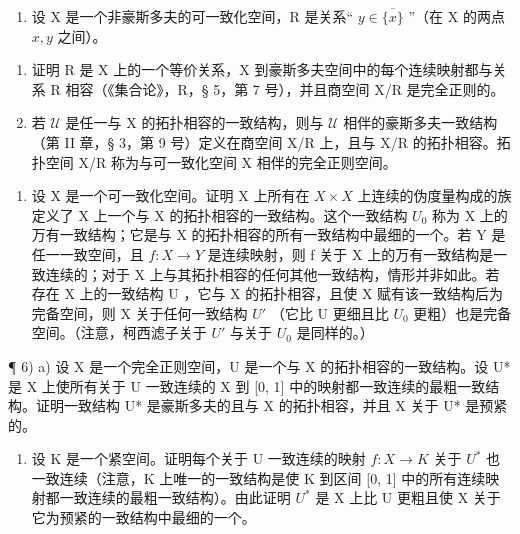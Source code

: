 \begin{enumerate}
\def\labelenumi{\arabic{enumi})}
\setcounter{enumi}{3}
\tightlist
\item
  设 X 是一个非豪斯多夫的可一致化空间，R 是关系`` \(y \in \overline{\{x\}}\) ''（在 X 的两点 \(x, y\) 之间）。
\end{enumerate}

\begin{enumerate}
\def\labelenumi{\alph{enumi})}
\item
  证明 R 是 X 上的一个等价关系，X 到豪斯多夫空间中的每个连续映射都与关系 R 相容（《集合论》，R，§ 5，第 7 号），并且商空间 X/R 是完全正则的。
\item
  若 \(\mathcal{U}\) 是任一与 X 的拓扑相容的一致结构，则与 \(\mathcal{U}\) 相伴的豪斯多夫一致结构（第 II 章，§ 3，第 9 号）定义在商空间 X/R 上，且与 X/R 的拓扑相容。拓扑空间 X/R 称为与可一致化空间 X 相伴的完全正则空间。
\end{enumerate}

\begin{enumerate}
\def\labelenumi{\arabic{enumi})}
\setcounter{enumi}{4}
\tightlist
\item
  设 X 是一个可一致化空间。证明 X 上所有在 \(X \times X\) 上连续的伪度量构成的族定义了 X 上一个与 X 的拓扑相容的一致结构。这个一致结构 \(U_{0}\) 称为 X 上的万有一致结构；它是与 X 的拓扑相容的所有一致结构中最细的一个。若 Y 是任一一致空间，且 \(f: X \to Y\) 是连续映射，则 f 关于 X 上的万有一致结构是一致连续的；对于 X 上与其拓扑相容的任何其他一致结构，情形并非如此。若存在 X 上的一致结构 U ，它与 X 的拓扑相容，且使 X 赋有该一致结构后为完备空间，则 X 关于任何一致结构 \(U'\) （它比 U 更细且比 \(U_{0}\) 更粗）也是完备空间。（注意，柯西滤子关于 \(U'\) 与关于 \(U_{0}\) 是同样的。）
\end{enumerate}

¶ 6) a) 设 X 是一个完全正则空间，U 是一个与 X 的拓扑相容的一致结构。设 U* 是 X 上使所有关于 U 一致连续的 X 到 {[}0, 1{]} 中的映射都一致连续的最粗一致结构。证明一致结构 U* 是豪斯多夫的且与 X 的拓扑相容，并且 X 关于 U* 是预紧的。

\begin{enumerate}
\def\labelenumi{\alph{enumi})}
\setcounter{enumi}{1}
\tightlist
\item
  设 K 是一个紧空间。证明每个关于 U 一致连续的映射 \(f: X \to K\) 关于 \(U^{*}\) 也一致连续（注意，K 上唯一的一致结构是使 K 到区间 {[}0, 1{]} 中的所有连续映射都一致连续的最粗一致结构）。由此证明 \(U^{*}\) 是 X 上比 U 更粗且使 X 关于它为预紧的一致结构中最细的一个。
\end{enumerate}

